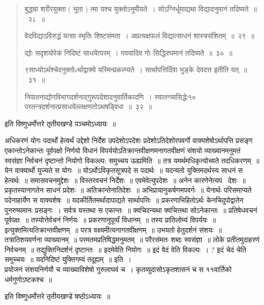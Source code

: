 \documentclass[11pt, openany]{book}
\begin{document}
\begin{quote}
{बुद्ध्या शरीरयुक्ता ( भूता ) त्मा यश्च युक्तोऽनुमीयते~। सोऽग्निर्धूमाद्यथा विद्यादनुमानं तदिष्यते~॥~२८~॥

वेदविद्याऽविरुद्धं यत्सा स्मृतिः शिष्टसंमता~। अप्रत्यक्षफलं विद्यात्साधनं शास्त्रसंशितम्~॥~२९~॥

द्योः सदृशयोरेकं निदिष्टं साधयेत्परम्~। गवयादिव गोः सिद्धिरुपमानं तदिष्यते~॥~३०~॥

९साध्योऽर्थश्चेदनुक्तोsर्थाद्वाक्ये यस्मिन्प्रकल्प्यते~। सार्थापत्तिर्दिवा भुङ्के देवदत्त इतीति यत्~॥~३१~॥

निपातनाद्योगविभागदर्शनाद्गुरूपदेशादनुवार्तिकादणि~। स्वातन्त्र्यसिद्धेः१० परतन्त्रदर्शनात्प्रसाधयेल्लक्षणतोऽथषड्विधा~॥~३२~॥}
\end{quote}

\vspace{-7mm}
\begin{flushright}
इति विष्णुधर्मोत्तरे तृतीयखण्डे पञ्चमोऽध्यायः~॥
\end{flushright}

अधिकरणं योगः पदार्थो हेत्वर्थं उद्देशो निर्देश उपदेशोऽपदेशः प्रदेशोऽतिदेशोरपवर्गो वाक्यशेषोऽर्थापत्ति प्रसङ्ग एकान्तोऽनेकान्तः पूर्वपक्षो निर्णयो विधानं विपर्ययोऽतिक्रान्तवीक्षणमनागतवीक्षणं संशयो व्याख्यानमनुमतं स्वसंज्ञा निर्वचनं दृष्टान्तो नियोगो विकल्ल्प: समुच्चय ऊह्यमिति~॥ तत्र यमर्थमधिकृत्योच्यते तदधिकरणम्~॥ येन वाक्यार्थो युज्यते स योगः~॥ योऽर्थोऽविकृतसूत्रपदे स पदार्थः~॥ यदन्यतो युक्तिमदर्थस्य साधनं स हेत्वर्थः~॥ समासवचनमुद्देशः~॥ विस्तरवचनं निर्देशः~॥ एवमेवेत्युपदेशः~॥ अनेन कारणेनेत्यप \textendash\ देशः~॥ प्रकृतस्यानागतेन साधनं प्रदेशः~॥ अतिक्रान्तेनातिदेशः~॥ अभिप्रायानुकर्षणमपवर्गः~॥ येनार्थः परिसमाप्यते पदेनाहार्येण स वाक्यशेषः~॥ यदकीर्तितमर्थादापाद्यते सार्थापत्तिः~॥ प्रकरणाभिहितोऽर्थः केनचिदुपोद्वातेन पुनरुष्यमानः प्रसङ्गः~। सर्वत्र यस्तथा स एकान्तः~॥ क्वचिदन्यथा क्वचित्तथा सोऽनेकान्तः~॥ प्रतिषेधवचनं पूर्वपक्षः~॥ तस्योत्तेर्वचनं निर्णयः~॥ प्रकरणानुपूर्व्यं विधानम्~॥ तस्य प्रातिलोम्यं विपर्ययः~॥ इत्युक्तमित्यतिक्रान्तवीक्षणम्~॥ परत्र वक्ष्यमीत्यनागतवीक्षणम्~॥ उभयतो हेतुदर्शनं संशयः~॥ तत्रातिशयवर्णना व्याख्यानम्~॥ परमतमप्रतिषिद्धमनुमतम्~॥ परैरसंमतः शब्दः स्वसंज्ञा~॥ लोके प्रतीतमुदाहरणं निर्वचनम्~॥ तद्युक्तिनिदर्शनं दृष्टान्तः~॥ इदमेवेति नियोगः~॥ इदं वेदं वेति विकल्पः~। ? इदं चेदं चेति समुच्चयः~॥ यदनिदिष्टं युक्तिगम्यं तदूह्यम्~॥ इति~।\\

प्रयोजनं संशयनिर्णयौ च व्याख्याविशेषो गुरुलाघवं च~। कृतव्युदासोऽकृतशासनं च स ११वार्तिको धर्मगुणोऽष्टकश्च~॥

\vspace{-7mm}
\begin{flushright}
इति विष्णुधर्मोत्तरे तृतीयखण्डे षष्ठोऽध्यायः~॥ 
\end{flushright}
\end{document}

